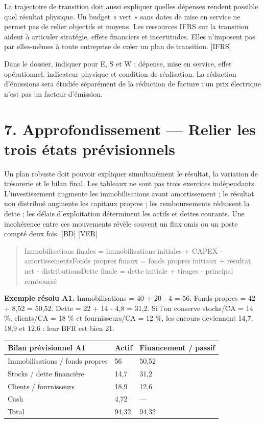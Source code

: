 \documentclass[12pt,a4paper]{article}
\begin{document}
La trajectoire de transition doit aussi expliquer quelles dépenses rendent possible quel résultat physique. Un budget « vert » sans dates de mise en service ne permet pas de relier objectifs et moyens. Les ressources IFRS sur la transition aident à articuler stratégie, effets financiers et incertitudes. Elles n’imposent pas par elles-mêmes à toute entreprise de créer un plan de transition. [IFRS]


Dans le dossier, indiquer pour E, S et W : dépense, mise en service, effet opérationnel, indicateur physique et condition de réalisation. La réduction d’émissions sera étudiée séparément de la réduction de facture : un prix électrique n’est pas un facteur d’émission.

\section*{7. Approfondissement --- Relier les trois états prévisionnels}
Un plan robuste doit pouvoir expliquer simultanément le résultat, la variation de trésorerie et le bilan final. Les tableaux ne sont pas trois exercices indépendants. L’investissement augmente les immobilisations avant amortissement ; le résultat non distribué augmente les capitaux propres ; les remboursements réduisent la dette ; les délais d’exploitation déterminent les actifs et dettes courants. Une incohérence entre ces mouvements révèle souvent un flux omis ou un poste compté deux fois. [BD] [VER]



\begin{quote}\small Immobilisations finales = immobilisations initiales + CAPEX - amortissements\newline Fonds propres finaux = fonds propres initiaux + résultat net - distributions\newline Dette finale = dette initiale + tirages - principal remboursé\end{quote}

\textbf{Exemple résolu A1.} Immobilisations = 40 + 20 - 4 = 56. Fonds propres = 42 + 8,52 = 50,52. Dette = 22 + 14 - 4,8 = 31,2. Si l’on conserve stocks/CA = 14 \%, clients/CA = 18 \% et fournisseurs/CA = 12 \%, les encours deviennent 14,7, 18,9 et 12,6 : leur BFR est bien 21.



\Needspace{250pt}
\begin{longtable}{p{5.07cm}p{5.07cm}p{5.07cm}}
\toprule
Bilan prévisionnel A1 & Actif & Financement / passif \\
\midrule\endhead
Immobilisations / fonds propres & 56 & 50,52 \\
Stocks / dette financière & 14,7 & 31,2 \\
Clients / fournisseurs & 18,9 & 12,6 \\
Cash & 4,72 & --- \\
Total & 94,32 & 94,32 \\
\bottomrule
\end{longtable}
\end{document}
